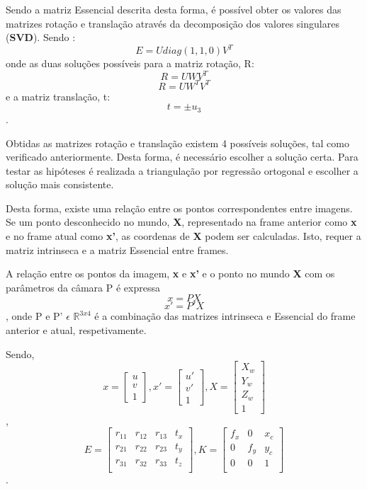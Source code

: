 	Sendo a matriz Essencial descrita desta forma, é possível obter os valores das matrizes rotação e translação através da decomposição dos valores singulares (\textbf{SVD}). Sendo : \[ E = U diag(1,1,0) V^{T} \] onde as duas soluções possíveis para a matriz rotação, R: \[ R = UWV^T \] \[ R = UW^TV^T \] e a matriz translação, t: \[ t = \pm u_3 \].
	
	
	Obtidas as matrizes rotação e translação existem 4 possíveis soluções, tal como verificado anteriormente. Desta forma, é necessário escolher a solução certa. Para testar as hipóteses é realizada a triangulação por regressão ortogonal e escolher a solução mais consistente.
	
	Desta forma, existe uma relação entre os pontos correspondentes entre imagens. Se um ponto desconhecido no mundo, \textbf{X}, representado na frame anterior como \textbf{x} e no frame atual como \textbf{x'}, as coordenas de \textbf{X} podem ser calculadas. Isto, requer a matriz intrinseca e a matriz Essencial entre frames.
	
	A relação entre os pontos da imagem, \textbf{x} e \textbf{x'} e o ponto no mundo \textbf{X} com os parâmetros da câmara P é expressa \[ x = P X \] \[ x' = P'X \], onde P e P' $\epsilon$  $\mathbb{R}^{3x4}$ é a combinação das matrizes intrinseca e Essencial do frame anterior e atual, respetivamente.
	
	Sendo, \[ x =  \left[ \begin{array}{ccc} u \\ v \\ 1 \end{array} \right],  x' =  \left[ \begin{array}{ccc} u' \\ v' \\ 1 \end{array} \right] ,  X =  \left[ \begin{array}{cccc} X_w \\ Y_w \\ Z_w \\ 1 \end{array} \right] \], \[ E =  \left[ \begin{array}{cccc} r_{11} & r_{12} & r_{13} & t_{x} \\ r_{21} & r_{22} & r_{23} & t_{y} \\ r_{31} & r_{32} & r_{33} & t_{z} \\ \end{array} \right] , K =  \left[ \begin{array}{ccc} f_x & 0 & x_c \\ 0 & f_y & y_c \\ 0 & 0 & 1 \\ \end{array} \right] \].
	
